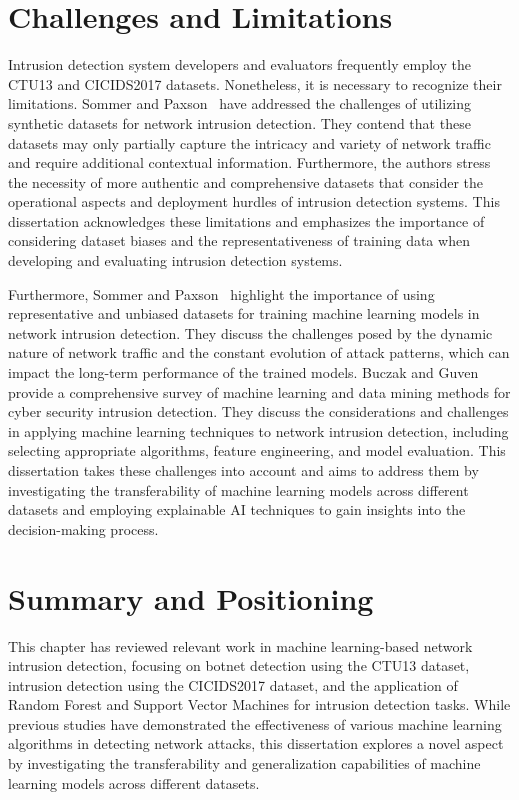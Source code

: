 \section{Challenges and Limitations}

Intrusion detection system developers and evaluators frequently employ the CTU13 and CICIDS2017 datasets. Nonetheless, it is necessary to recognize their limitations. Sommer and Paxson~\cite{sommer2010outside} have addressed the challenges of utilizing synthetic datasets for network intrusion detection. They contend that these datasets may only partially capture the intricacy and variety of network traffic and require additional contextual information. Furthermore, the authors stress the necessity of more authentic and comprehensive datasets that consider the operational aspects and deployment hurdles of intrusion detection systems. This dissertation acknowledges these limitations and emphasizes the importance of considering dataset biases and the representativeness of training data when developing and evaluating intrusion detection systems.

Furthermore, Sommer and Paxson~\cite{sommer2010outside} highlight the importance of using representative and unbiased datasets for training machine learning models in network intrusion detection. They discuss the challenges posed by the dynamic nature of network traffic and the constant evolution of attack patterns, which can impact the long-term performance of the trained models. Buczak and Guven~\cite{buczak2015survey} provide a comprehensive survey of machine learning and data mining methods for cyber security intrusion detection. They discuss the considerations and challenges in applying machine learning techniques to network intrusion detection, including selecting appropriate algorithms, feature engineering, and model evaluation. This dissertation takes these challenges into account and aims to address them by investigating the transferability of machine learning models across different datasets and employing explainable AI techniques to gain insights into the decision-making process.

\section{Summary and Positioning}

This chapter has reviewed relevant work in machine learning-based network intrusion detection, focusing on botnet detection using the CTU13 dataset, intrusion detection using the CICIDS2017 dataset, and the application of Random Forest and Support Vector Machines for intrusion detection tasks. While previous studies have demonstrated the effectiveness of various machine learning algorithms in detecting network attacks, this dissertation explores a novel aspect by investigating the transferability and generalization capabilities of machine learning models across different datasets.

